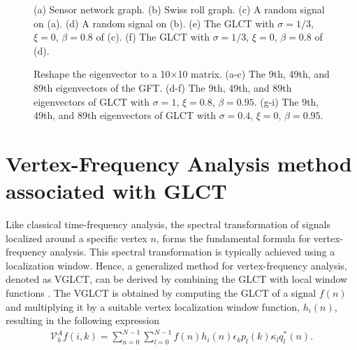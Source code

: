 \documentclass[lettersize,journal]{IEEEtran}
\begin{document}
\begin{figure}
	\centering
	\quad
	\quad
	\caption{(a) Sensor network graph. (b) Swiss roll graph. (c) A random signal on (a). (d) A random signal on (b). (e) The GLCT with $\sigma=1/3$, $\xi=0$, $\beta=0.8$ of (c). (f) The GLCT with $\sigma=1/3$, $\xi=0$, $\beta=0.8$ of (d).}\label{fig1}
\end{figure}

\begin{figure}
	\centering
	\quad
	\quad
	\caption{Reshape the eigenvector to a 10×10 matrix. (a-c) The 9th, 49th, and 89th eigenvectors of the GFT. (d-f) The 9th, 49th, and 89th eigenvectors of GLCT with $\sigma=1$, $\xi=0.8$, $\beta=0.95$. (g-i) The 9th, 49th, and 89th eigenvectors of GLCT with $\sigma=0.4$, $\xi=0$, $\beta=0.95$. }\label{fig1_2}
\end{figure}





\section{Vertex-Frequency Analysis method associated with GLCT}
\label{sec4}
 Like classical time-frequency analysis, the spectral transformation of signals localized around a specific vertex $n$, forms the fundamental formula for vertex-frequency analysis. This spectral transformation is typically achieved using a localization window. 
Hence, a generalized method for vertex-frequency analysis, denoted as VGLCT, can be derived by combining the GLCT with local window functions \cite{stankovic2017vertex, stankovic2020vertex}. The VGLCT is obtained by computing the GLCT of a signal $f(n)$ and multiplying it by a suitable vertex localization window function, $h_i(n)$, resulting in the following expression
\begin{align}
	\mathcal{V}_h^Af(i,k)= \sum_{n=0}^{N-1} \sum_{l=0}^{N-1} f(n) h_i(n) \epsilon_k p_l(k) \kappa_l q_l^*(n).
\end{align}
\end{document}
